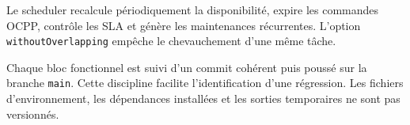 Le scheduler recalcule périodiquement la disponibilité, expire les commandes
OCPP, contrôle les SLA et génère les maintenances récurrentes. L'option
\texttt{withoutOverlapping} empêche le chevauchement d'une même tâche.

Chaque bloc fonctionnel est suivi d'un commit cohérent puis poussé sur la branche
\texttt{main}. Cette discipline facilite l'identification d'une régression. Les
fichiers d'environnement, les dépendances installées et les sorties temporaires
ne sont pas versionnés.
